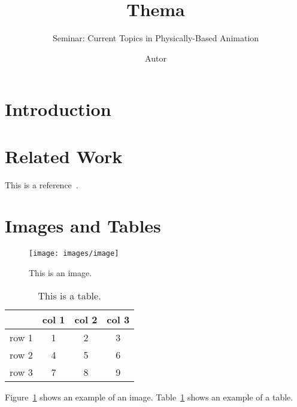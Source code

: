 \documentclass[
	11pt, 
	DIV=10,
	a4paper, 
	oneside, 
	headings=normal, 
	captions=tableheading,
	final, 
	numbers=noenddot
]{scrartcl}
\title{Thema}
\subtitle{\vspace{0.5cm}Seminar: Current Topics in Physically-Based Animation}
\author{Autor}
\begin{document}
\maketitle


\section{Introduction}
\lipsum[2-4]

\section{Related Work}

This is a reference~\cite{Foley:1990}.

\section{Images and Tables}

\begin{figure}[tb]
	\centering
	\texttt{[image: images/image]} 
	\caption{\label{fig:image} This is an image.
	}
\end{figure}

\begin{table}[tb]
	{
		\centering
		\begin{tabular}{|c|c|c|c|}
			\hline
			& col 1 & col 2 & col 3   \\
			\hline	
			row 1  & 1 & 2 & 3 \\
			row 2  & 4 & 5 & 6 \\
			row 3  & 7 & 8 & 9 \\
			\hline
		\end{tabular}
		\caption{\label{tab:example} This is a table.}
	}
\end{table}


Figure~\ref{fig:image} shows an example of an image.
Table~\ref{tab:example} shows an example of a table.




\end{document}
